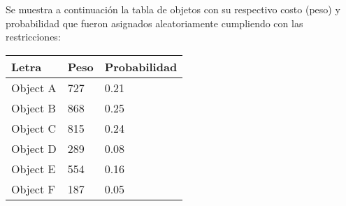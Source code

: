 \documentclass[10pt,letterpaper]{article}
\begin{document}
Se muestra a continuación la tabla de objetos con su respectivo costo (peso) y probabilidad 
        que fueron asignados aleatoriamente cumpliendo con las restricciones: 
\begin{center}
\begin{tabu} to 0.6\textwidth { | X[l] | X[l] | X[l] | } 
\hline
{}
\textbf{Letra} & \textbf{Peso} & \textbf{Probabilidad}\\
\hline
Object A & 727 & 0.21 \\
\hline
Object B & 868 & 0.25 \\
\hline
Object C & 815 & 0.24 \\
\hline
Object D & 289 & 0.08 \\
\hline
Object E & 554 & 0.16 \\
\hline
Object F & 187 & 0.05 \\
\hline
\end{tabu} \\
\end{center}
\end{document}
